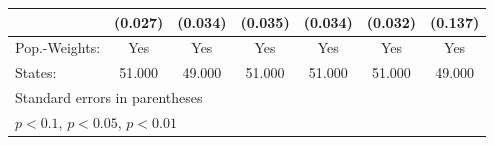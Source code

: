 {\begin{tabular}{l*{6}{c}}
            &     (0.027)         &     (0.034)         &     (0.035)         &     (0.034)         &     (0.032)         &     (0.137)         \\
\hline
Pop.-Weights:&         Yes         &         Yes         &         Yes         &         Yes         &         Yes         &         Yes         \\
States:     &      51.000         &      49.000         &      51.000         &      51.000         &      51.000         &      49.000         \\
\hline\hline
\multicolumn{7}{l}{\footnotesize Standard errors in parentheses}\\
\multicolumn{7}{l}{\footnotesize \sym{*} \(p<0.1\), \sym{**} \(p<0.05\), \sym{***} \(p<0.01\)}\\
\end{tabular}
}
